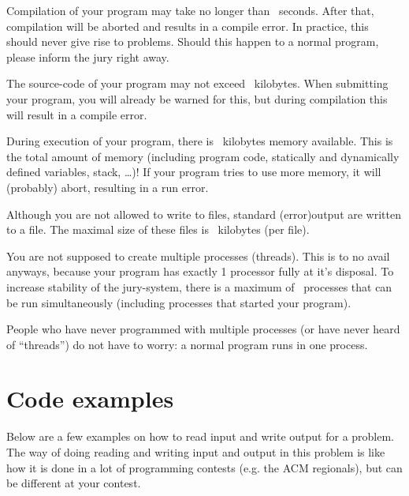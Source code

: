 \begin{description}
\item[compile time]
Compilation of your program may take no longer than \COMPILETIME\
seconds. After that, compilation will be aborted and results in a
compile error. In practice, this should never give rise to
problems. Should this happen to a normal program, please inform the
jury right away.

\item[source size]
The source-code of your program may not exceed \SOURCESIZE\ kilobytes.
When submitting your program, you will already be warned for this, but
during compilation this will result in a compile error.

\item[memory]
During execution of your program, there is \MEMLIMIT\ kilobytes memory
available. This is the total amount of memory (including program code,
statically and dynamically defined variables, stack, \dots)! If your
program tries to use more memory, it will (probably) abort, resulting
in a run error.

\item[filesize]
Although you are not allowed to write to files, standard (error)output
are written to a file. The maximal size of these files is \FILELIMIT\
kilobytes (per file).

\item[number of processes]
You are not supposed to create multiple processes (threads). This is
to no avail anyways, because your program has exactly 1 processor fully
at it's disposal. To increase stability of the jury-system, there is a
maximum of \PROCLIMIT\ processes that can be run simultaneously
(including processes that started your program).

People who have never programmed with multiple processes (or have
never heard of ``threads'') do not have to worry: a normal program
runs in one process.

\end{description}


\newpage
\appendix

\section{Code examples}\label{codeexamples}

Below are a few examples on how to read input and write output for a
problem. The way of doing reading and writing input and output in this problem
is like how it is done in a lot of programming contests (e.g. the ACM
regionals), but can be different at your contest.

